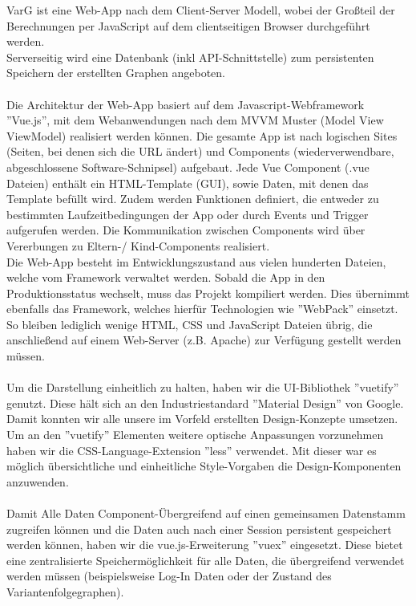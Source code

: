 \documentclass[twoside]{report}
\begin{document}
VarG ist eine Web-App nach dem Client-Server Modell, wobei der Großteil der Berechnungen per JavaScript auf dem clientseitigen Browser
durchgeführt werden.
\\Serverseitig wird eine Datenbank (inkl API-Schnittstelle) zum persistenten Speichern der erstellten Graphen angeboten.
\\
\\Die Architektur der Web-App basiert auf dem Javascript-Webframework ''Vue.js'', 
mit dem Webanwendungen nach dem MVVM Muster (Model View ViewModel) realisiert werden können. Die gesamte App ist nach logischen
Sites (Seiten, bei denen sich die URL ändert) und Components (wiederverwendbare, abgeschlossene Software-Schnipsel) aufgebaut.
Jede Vue Component (.vue Dateien) enthält ein HTML-Template (GUI), sowie Daten, mit denen das Template befüllt wird. Zudem werden
Funktionen definiert, die entweder zu bestimmten Laufzeitbedingungen der App oder durch Events und Trigger aufgerufen werden.
Die Kommunikation zwischen Components wird über Vererbungen zu Eltern-/ Kind-Components realisiert.
\\Die Web-App besteht im Entwicklungszustand aus vielen hunderten Dateien, welche vom Framework verwaltet werden. Sobald
die App in den Produktionsstatus wechselt, muss das Projekt kompiliert werden. Dies übernimmt ebenfalls das Framework, welches
hierfür Technologien wie ''WebPack'' einsetzt. So bleiben lediglich wenige HTML, CSS und JavaScript Dateien übrig, die anschließend
auf einem Web-Server (z.B. Apache) zur Verfügung gestellt werden müssen.
\\
\\Um die Darstellung einheitlich zu halten, haben wir die UI-Bibliothek ''vuetify'' genutzt. Diese hält sich an den Industriestandard
''Material Design'' von Google. Damit konnten wir alle unsere im Vorfeld erstellten Design-Konzepte umsetzen. Um an den ''vuetify'' Elementen
weitere optische Anpassungen vorzunehmen haben wir die CSS-Language-Extension ''less'' verwendet. Mit dieser war es möglich übersichtliche und
einheitliche Style-Vorgaben die Design-Komponenten anzuwenden. 
\\
\\Damit Alle Daten Component-Übergreifend auf einen gemeinsamen Datenstamm zugreifen können und die Daten auch nach einer Session persistent
gespeichert werden können, haben wir die vue.js-Erweiterung ''vuex'' eingesetzt. Diese bietet eine zentralisierte Speichermöglichkeit
für alle Daten, die übergreifend verwendet werden müssen (beispielsweise Log-In Daten oder der Zustand des Variantenfolgegraphen).
\end{document}
